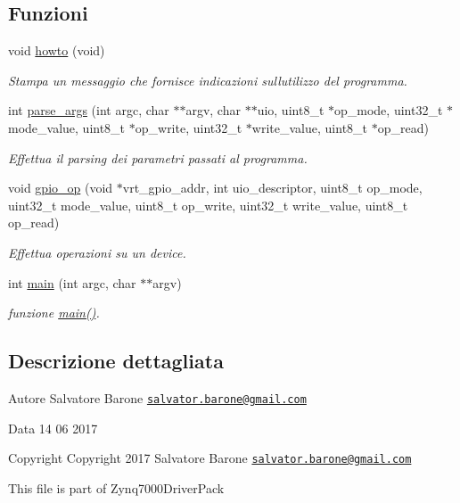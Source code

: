 \subsection*{Funzioni}
\begin{DoxyCompactItemize}
\item 
void \hyperlink{uio-int_8c_a05909651fa170a63e98e3f8e13451b7b}{howto} (void)
\begin{DoxyCompactList}\small\item\em Stampa un messaggio che fornisce indicazioni sull\textquotesingle{}utilizzo del programma. \end{DoxyCompactList}\item 
int \hyperlink{uio-int_8c_ab6b18eb1bf7bc996599c06dc6dad8f53}{parse\+\_\+args} (int argc, char $\ast$$\ast$argv, char $\ast$$\ast$uio, uint8\+\_\+t $\ast$op\+\_\+mode, uint32\+\_\+t $\ast$mode\+\_\+value, uint8\+\_\+t $\ast$op\+\_\+write, uint32\+\_\+t $\ast$write\+\_\+value, uint8\+\_\+t $\ast$op\+\_\+read)
\begin{DoxyCompactList}\small\item\em Effettua il parsing dei parametri passati al programma. \end{DoxyCompactList}\item 
void \hyperlink{uio-int_8c_a78b676750c5d08c316cad35ec3963c53}{gpio\+\_\+op} (void $\ast$vrt\+\_\+gpio\+\_\+addr, int uio\+\_\+descriptor, uint8\+\_\+t op\+\_\+mode, uint32\+\_\+t mode\+\_\+value, uint8\+\_\+t op\+\_\+write, uint32\+\_\+t write\+\_\+value, uint8\+\_\+t op\+\_\+read)
\begin{DoxyCompactList}\small\item\em Effettua operazioni su un device. \end{DoxyCompactList}\item 
int \hyperlink{uio-int_8c_a3c04138a5bfe5d72780bb7e82a18e627}{main} (int argc, char $\ast$$\ast$argv)
\begin{DoxyCompactList}\small\item\em funzione \hyperlink{uio-int_8c_a3c04138a5bfe5d72780bb7e82a18e627}{main()}. \end{DoxyCompactList}\end{DoxyCompactItemize}


\subsection{Descrizione dettagliata}
\begin{DoxyAuthor}{Autore}
Salvatore Barone \href{mailto:salvator.barone@gmail.com}{\tt salvator.\+barone@gmail.\+com} 
\end{DoxyAuthor}
\begin{DoxyDate}{Data}
14 06 2017
\end{DoxyDate}
\begin{DoxyCopyright}{Copyright}
Copyright 2017 Salvatore Barone \href{mailto:salvator.barone@gmail.com}{\tt salvator.\+barone@gmail.\+com}
\end{DoxyCopyright}
This file is part of Zynq7000\+Driver\+Pack

